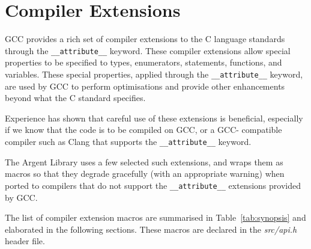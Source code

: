 
\lstset{style=CODE}


\chapter{Compiler Extensions}

GCC provides a rich set of compiler extensions to the C language standards
through the \texttt{\_\_attribute\_\_} keyword. These compiler extensions allow 
special properties to be specified to types, enumerators, statements, functions, 
and variables. These special properties, applied through the 
\texttt{\_\_attribute\_\_} keyword, are used by GCC to perform optimisations and
provide other enhancements beyond what the C standard specifies.

Experience has shown that careful use of these extensions is beneficial,
especially if we know that the code is to be compiled on GCC, or a GCC-
compatible compiler such as Clang that supports the 
\texttt{\_\_attribute\_\_} keyword.

The Argent Library uses a few selected such extensions, and wraps them as macros
so that they degrade gracefully (with an appropriate warning) when ported to 
compilers that do not support the \texttt{\_\_attribute\_\_} extensions provided
by GCC.

The list of compiler extension macros are summarised in Table~\ref{tab:synopsis}
and elaborated in the following sections. These macros are declared in the
\emph{src/api.h} header file.

